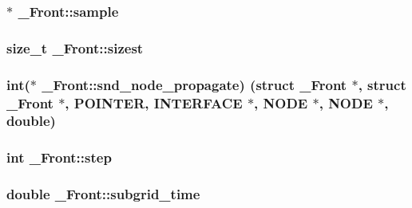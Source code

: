\subsubsection[{\texorpdfstring{sample}{sample}}]{$\ast$ \+\_\+\+Front\+::sample}\hypertarget{struct___front_ab9318e465f87caf3bc569c5eb22c3049}{}\label{struct___front_ab9318e465f87caf3bc569c5eb22c3049}
\subsubsection[{\texorpdfstring{sizest}{sizest}}]{\setlength{\rightskip}{0pt plus 5cm}size\+\_\+t \+\_\+\+Front\+::sizest}\hypertarget{struct___front_a7f83e7602e00fb30de654b99f9eb8df2}{}\label{struct___front_a7f83e7602e00fb30de654b99f9eb8df2}
\subsubsection[{\texorpdfstring{snd\+\_\+node\+\_\+propagate}{snd_node_propagate}}]{\setlength{\rightskip}{0pt plus 5cm}int($\ast$ \+\_\+\+Front\+::snd\+\_\+node\+\_\+propagate) (struct {\bf \+\_\+\+Front} $\ast$, struct {\bf \+\_\+\+Front} $\ast$, {\bf P\+O\+I\+N\+T\+ER}, {\bf I\+N\+T\+E\+R\+F\+A\+CE} $\ast$, {\bf N\+O\+DE} $\ast$, {\bf N\+O\+DE} $\ast$, double)}\hypertarget{struct___front_aa4eb27e8069ffbfc04a06ad00cd551e8}{}\label{struct___front_aa4eb27e8069ffbfc04a06ad00cd551e8}
\subsubsection[{\texorpdfstring{step}{step}}]{\setlength{\rightskip}{0pt plus 5cm}int \+\_\+\+Front\+::step}\hypertarget{struct___front_ae49f76a2babb005a07ddec5e0bfbcde6}{}\label{struct___front_ae49f76a2babb005a07ddec5e0bfbcde6}
\subsubsection[{\texorpdfstring{subgrid\+\_\+time}{subgrid_time}}]{\setlength{\rightskip}{0pt plus 5cm}double \+\_\+\+Front\+::subgrid\+\_\+time}\hypertarget{struct___front_a807edb1f05fa55827055ccf830d082b4}{}\label{struct___front_a807edb1f05fa55827055ccf830d082b4}
